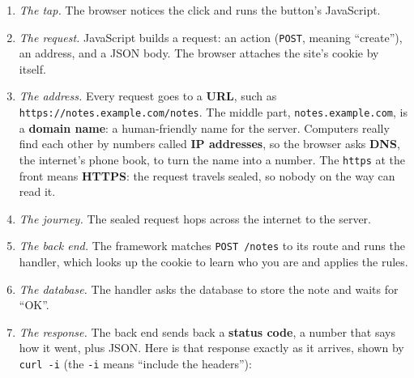 \begin{enumerate}
\def\labelenumi{\arabic{enumi}.}
\item
  \emph{The tap.} The browser notices the click and runs the button's JavaScript.
\item
  \emph{The request.} JavaScript builds a request: an action (\texttt{POST}, meaning ``create''), an address, and a JSON body. The browser attaches the site's cookie by itself.
\item
  \emph{The address.} Every request goes to a \textbf{URL}, such as \texttt{https:}\allowbreak{}\texttt{/}\allowbreak{}\texttt{/}\allowbreak{}\texttt{notes.}\allowbreak{}\texttt{example.}\allowbreak{}\texttt{com/}\allowbreak{}\texttt{notes}. The middle part, \texttt{notes.example.com}, is a \textbf{domain name}: a human-friendly name for the server. Computers really find each other by numbers called \textbf{IP addresses}, so the browser asks \textbf{DNS}, the internet's phone book, to turn the name into a number. The \texttt{https} at the front means \textbf{HTTPS}: the request travels sealed, so nobody on the way can read it.
\item
  \emph{The journey.} The sealed request hops across the internet to the server.
\item
  \emph{The back end.} The framework matches \texttt{POST\ /notes} to its route and runs the handler, which looks up the cookie to learn who you are and applies the rules.
\item
  \emph{The database.} The handler asks the database to store the note and waits for ``OK''.
\item
  \emph{The response.} The back end sends back a \textbf{status code}, a number that says how it went, plus JSON. Here is that response exactly as it arrives, shown by \texttt{curl\ -i} (the \texttt{-i} means ``include the headers''):

  \begin{codebox}[short]

\begin{Shaded}
\begin{Highlighting}[]
  \DataTypeTok{\textbackslash{}}
    \DataTypeTok{\textbackslash{}}
   
\end{Highlighting}
\end{Shaded}


\end{codebox}
\end{enumerate}
